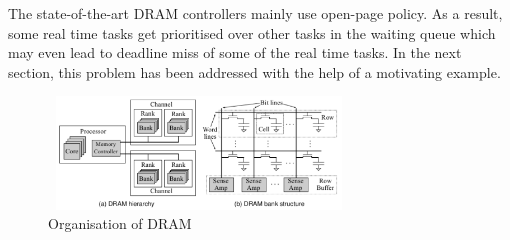 The state-of-the-art DRAM controllers mainly use open-page policy. As a result, some real time tasks get prioritised
over other tasks in the waiting queue which may even lead to deadline miss of some of the real time tasks. In the next section, this 
problem has been addressed with the help of a motivating example.






\begin{figure}[t]
\centering
\includegraphics[width=8cm,height=3cm]{Dram_org.png}
\caption{Organisation of DRAM}
\label{fig3}
\end{figure}